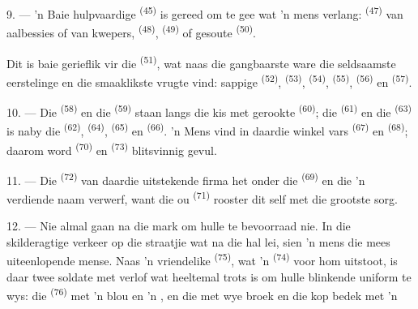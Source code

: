 9. --- 'n Baie hulpvaardige  \textsuperscript{(45)} is gereed om
te gee wat 'n mens verlang:  \textsuperscript{(47)} van aalbessies of van
kwepers,  \textsuperscript{(48)},  \textsuperscript{(49)} of
gesoute  \textsuperscript{(50)}.

Dit is baie gerieflik vir die  \textsuperscript{(51)}, wat naas die
gangbaarste ware die seldsaamste eerstelinge en die smaaklikste vrugte vind: sappige
 \textsuperscript{(52)},  \textsuperscript{(53)},
 \textsuperscript{(54)},  \textsuperscript{(55)},
 \textsuperscript{(56)} en  \textsuperscript{(57)}.

\VUsaut{4.0mm}
\VUsaut{3.0mm}

10. --- Die  \textsuperscript{(58)} en die 
\textsuperscript{(59)} staan langs die kis met gerookte 
\textsuperscript{(60)}; die  \textsuperscript{(61)} en die
 \textsuperscript{(63)} is naby die 
\textsuperscript{(62)},  \textsuperscript{(64)}, 
\textsuperscript{(65)} en  \textsuperscript{(66)}. 'n Mens vind in
daardie winkel vars  \textsuperscript{(67)} en 
\textsuperscript{(68)}; daarom word  \textsuperscript{(70)} en
 \textsuperscript{(73)} blitsvinnig gevul.

11. --- Die  \textsuperscript{(72)} van daardie uitstekende firma het
onder die  \textsuperscript{(69)} en die  'n
verdiende naam verwerf, want die ou  \textsuperscript{(71)} rooster
dit self met die grootste sorg.

\VUsaut{4.0mm}
\VUsaut{3.0mm}

12. --- Nie almal gaan na die mark om hulle te bevoorraad nie. In die skilderagtige
verkeer op die straatjie wat na die hal lei, sien 'n mens die mees uiteenlopende mense.
Naas 'n vriendelike  \textsuperscript{(75)}, wat 'n
 \textsuperscript{(74)} voor hom uitstoot, is daar twee soldate met verlof
wat heeltemal trots is om hulle blinkende uniform te wys: die 
\textsuperscript{(76)} met 'n blou  en 'n , en die
 met wye broek en die kop bedek met 'n 

